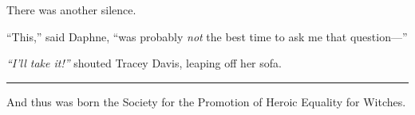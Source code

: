 There was another silence.

``This,'' said Daphne, ``was probably \emph{not} the best time to ask me
that question---''

\emph{``I'll take it!''} shouted Tracey Davis, leaping off her sofa.

\begin{center}\rule{3in}{0.4pt}\end{center}

And thus was born the Society for the Promotion of Heroic Equality for
Witches.
